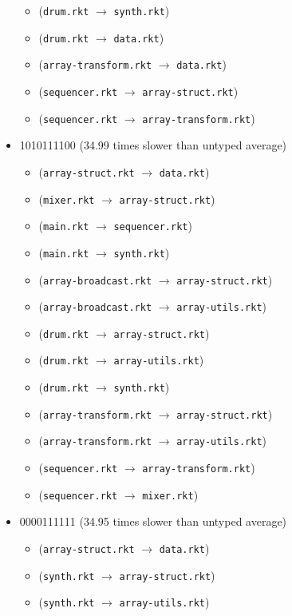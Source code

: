 \documentclass{article}
\newcommand{\mono}[1]{\texttt{#1}}
\begin{document}
\begin{itemize}
\begin{itemize}
  \item (\mono{drum.rkt} $\rightarrow$ \mono{synth.rkt})
  \item (\mono{drum.rkt} $\rightarrow$ \mono{data.rkt})
  \item (\mono{array-transform.rkt} $\rightarrow$ \mono{data.rkt})
  \item (\mono{sequencer.rkt} $\rightarrow$ \mono{array-struct.rkt})
  \item (\mono{sequencer.rkt} $\rightarrow$ \mono{array-transform.rkt})
  \end{itemize}
\item 1010111100 (34.99 times slower than untyped average)
  \begin{itemize}
  \item (\mono{array-struct.rkt} $\rightarrow$ \mono{data.rkt})
  \item (\mono{mixer.rkt} $\rightarrow$ \mono{array-struct.rkt})
  \item (\mono{main.rkt} $\rightarrow$ \mono{sequencer.rkt})
  \item (\mono{main.rkt} $\rightarrow$ \mono{synth.rkt})
  \item (\mono{array-broadcast.rkt} $\rightarrow$ \mono{array-struct.rkt})
  \item (\mono{array-broadcast.rkt} $\rightarrow$ \mono{array-utils.rkt})
  \item (\mono{drum.rkt} $\rightarrow$ \mono{array-struct.rkt})
  \item (\mono{drum.rkt} $\rightarrow$ \mono{array-utils.rkt})
  \item (\mono{drum.rkt} $\rightarrow$ \mono{synth.rkt})
  \item (\mono{array-transform.rkt} $\rightarrow$ \mono{array-struct.rkt})
  \item (\mono{array-transform.rkt} $\rightarrow$ \mono{array-utils.rkt})
  \item (\mono{sequencer.rkt} $\rightarrow$ \mono{array-transform.rkt})
  \item (\mono{sequencer.rkt} $\rightarrow$ \mono{mixer.rkt})
  \end{itemize}
\item 0000111111 (34.95 times slower than untyped average)
  \begin{itemize}
  \item (\mono{array-struct.rkt} $\rightarrow$ \mono{data.rkt})
  \item (\mono{synth.rkt} $\rightarrow$ \mono{array-struct.rkt})
  \item (\mono{synth.rkt} $\rightarrow$ \mono{array-utils.rkt})

\end{itemize}
\end{itemize}
\end{document}
